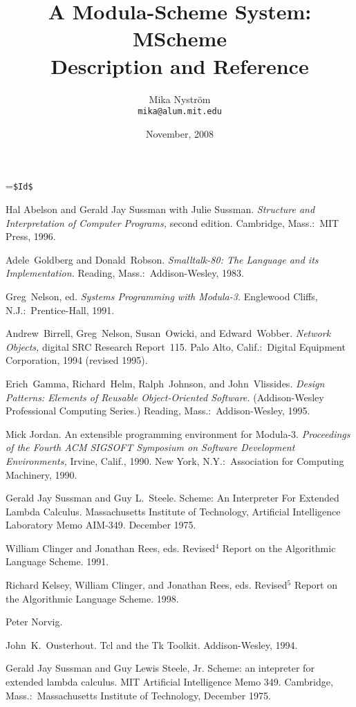 \documentclass[12pt]{report}
\title{\bfseries\sffamily\fontsize{24.88}{30}\selectfont A Modula-Scheme System: \\ MScheme \\ Description and Reference}
\author{Mika Nystr\"om \\ {\tt mika@alum.mit.edu}}
\date{November, 2008}
\begin{document}
\def\ns{}
\ifx\DIST\undefined
{}=\vbox{\verb+$Id$+}
\fi

\thispagestyle{empty}

\maketitle

\thispagestyle{empty}

\newpage
\tableofcontents
\newpage







\newpage
{
\frenchspacing
\begin{thebibliography}{99}

 Hal Abelson and Gerald Jay Sussman with Julie Sussman.  {\it Structure and Interpretation of Computer Programs,} second edition.  Cambridge, Mass.:\ MIT Press, 1996.

 Adele~Goldberg and Donald~Robson.  {\it Smalltalk-80: The Language and its Implementation.}  Reading, Mass.:\ Addison-Wesley, 1983.

  Greg~Nelson, ed.  {\it Systems Programming with Modula-3.}  Englewood Cliffs, N.J.:\ Prentice-Hall, 1991.

 Andrew~Birrell, Greg~Nelson, Susan~Owicki, and Edward~Wobber.  {\it Network Objects,} digital SRC Research Report~115.  Palo Alto, Calif.:\ Digital Equipment Corporation, 1994 (revised 1995).

 Erich~Gamma, Richard~Helm, Ralph~Johnson, and John~Vlissides.  {\it Design Patterns: Elements of Reusable Object-Oriented Software.}  (Addison-Wesley Professional Computing Series.)  Reading, Mass.:\ Addison-Wesley, 1995.

  Mick Jordan.  An extensible programming environment for Modula-3.  {\it Proceedings of the Fourth ACM SIGSOFT Symposium on Software Development Environments,} Irvine, Calif., 1990.  New York, N.Y.:\ Association for Computing Machinery, 1990.

 Gerald Jay Sussman and Guy L.~Steele. Scheme: An Interpreter For Extended Lambda Calculus.  Massachusetts Institute of Technology, Artificial Intelligence Laboratory Memo AIM-349.  December 1975.
  
 William Clinger and Jonathan Rees, eds.
Revised$^4$ Report on the Algorithmic Language Scheme.  1991.

 Richard Kelsey, William Clinger, and Jonathan Rees, eds.
Revised$^5$ Report on the Algorithmic Language Scheme.  1998.

 Peter Norvig.

 John~K.~Ousterhout.  Tcl and the Tk Toolkit.  Addison-Wesley, 1994.

 Gerald Jay Sussman and Guy Lewis Steele, Jr.  Scheme: an intepreter for extended lambda calculus.  MIT Artificial Intelligence Memo 349.  Cambridge, Mass.:\ Massachusetts Institute of Technology, December 1975.
\end{thebibliography}
}
\end{document}
